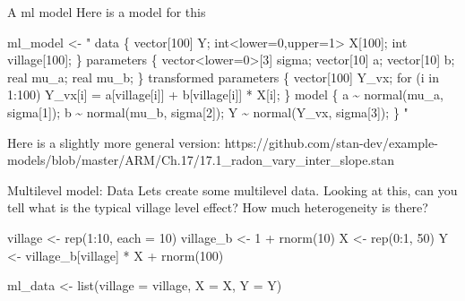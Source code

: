 \documentclass[
  11pt,
  ignorenonframetext,
]{beamer}
\newenvironment{Shaded}{\begin{snugshade}}{\end{snugshade}}
\newcommand{\AttributeTok}[1]{\textcolor[rgb]{0.40,0.45,0.13}{#1}}
\newcommand{\DecValTok}[1]{\textcolor[rgb]{0.68,0.00,0.00}{#1}}
\newcommand{\FunctionTok}[1]{\textcolor[rgb]{0.28,0.35,0.67}{#1}}
\newcommand{\NormalTok}[1]{\textcolor[rgb]{0.00,0.23,0.31}{#1}}
\newcommand{\OtherTok}[1]{\textcolor[rgb]{0.00,0.23,0.31}{#1}}
\newcommand{\SpecialCharTok}[1]{\textcolor[rgb]{0.37,0.37,0.37}{#1}}
\newcommand{\StringTok}[1]{\textcolor[rgb]{0.13,0.47,0.30}{#1}}
\begin{document}
\begin{frame}[fragile]{A ml model}
\protect\hypertarget{a-ml-model}{}
Here is a model for this

\tiny

\begin{Shaded}
\begin{Highlighting}[]
\NormalTok{ml\_model }\OtherTok{\textless{}{-}} \StringTok{"}
\StringTok{data \{}
\StringTok{  vector[100] Y;}
\StringTok{  int\textless{}lower=0,upper=1\textgreater{} X[100];}
\StringTok{  int village[100];}
\StringTok{\}}
\StringTok{parameters \{}
\StringTok{  vector\textless{}lower=0\textgreater{}[3] sigma; }
\StringTok{  vector[10] a;}
\StringTok{  vector[10] b;}
\StringTok{  real mu\_a;}
\StringTok{  real mu\_b;}
\StringTok{\}}
\StringTok{transformed parameters \{}
\StringTok{  vector[100] Y\_vx;}
\StringTok{  for (i in 1:100) Y\_vx[i] = a[village[i]] + b[village[i]] * X[i];}
\StringTok{\}}
\StringTok{model \{}
\StringTok{  a \textasciitilde{} normal(mu\_a, sigma[1]);}
\StringTok{  b \textasciitilde{} normal(mu\_b, sigma[2]);}
\StringTok{  Y \textasciitilde{} normal(Y\_vx, sigma[3]);}
\StringTok{\}}
\StringTok{"}
\end{Highlighting}
\end{Shaded}

Here is a slightly more general version:
https://github.com/stan-dev/example-models/blob/master/ARM/Ch.17/17.1\_radon\_vary\_inter\_slope.stan
\end{frame}

\begin{frame}[fragile]{Multilevel model: Data}
\protect\hypertarget{multilevel-model-data}{}
Lets create some multilevel data. Looking at this, can you tell what is
the typical village level effect? How much heterogeneity is there?

\begin{Shaded}
\begin{Highlighting}[]
\NormalTok{village }\OtherTok{\textless{}{-}} \FunctionTok{rep}\NormalTok{(}\DecValTok{1}\SpecialCharTok{:}\DecValTok{10}\NormalTok{, }\AttributeTok{each =} \DecValTok{10}\NormalTok{)}
\NormalTok{village\_b }\OtherTok{\textless{}{-}} \DecValTok{1} \SpecialCharTok{+} \FunctionTok{rnorm}\NormalTok{(}\DecValTok{10}\NormalTok{)}
\NormalTok{X }\OtherTok{\textless{}{-}} \FunctionTok{rep}\NormalTok{(}\DecValTok{0}\SpecialCharTok{:}\DecValTok{1}\NormalTok{, }\DecValTok{50}\NormalTok{)}
\NormalTok{Y }\OtherTok{\textless{}{-}}\NormalTok{ village\_b[village] }\SpecialCharTok{*}\NormalTok{ X }\SpecialCharTok{+} \FunctionTok{rnorm}\NormalTok{(}\DecValTok{100}\NormalTok{)}

\NormalTok{ml\_data }\OtherTok{\textless{}{-}} \FunctionTok{list}\NormalTok{(}\AttributeTok{village =}\NormalTok{ village, }\AttributeTok{X =}\NormalTok{ X, }\AttributeTok{Y =}\NormalTok{ Y)}
\end{Highlighting}
\end{Shaded}
\end{frame}
\end{document}
